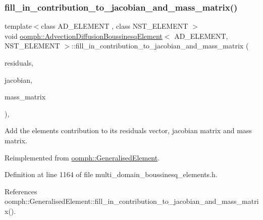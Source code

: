 \subsubsection{\texorpdfstring{fill\+\_\+in\+\_\+contribution\+\_\+to\+\_\+jacobian\+\_\+and\+\_\+mass\+\_\+matrix()}{fill\_in\_contribution\_to\_jacobian\_and\_mass\_matrix()}}
{\footnotesize\ttfamily template$<$class A\+D\+\_\+\+E\+L\+E\+M\+E\+NT , class N\+S\+T\+\_\+\+E\+L\+E\+M\+E\+NT $>$ \\
void \hyperlink{classoomph_1_1AdvectionDiffusionBoussinesqElement}{oomph\+::\+Advection\+Diffusion\+Boussinesq\+Element}$<$ A\+D\+\_\+\+E\+L\+E\+M\+E\+NT, N\+S\+T\+\_\+\+E\+L\+E\+M\+E\+NT $>$\+::fill\+\_\+in\+\_\+contribution\+\_\+to\+\_\+jacobian\+\_\+and\+\_\+mass\+\_\+matrix (\begin{DoxyParamCaption}\item[{\hyperlink{classoomph_1_1Vector}{Vector}$<$ double $>$ \&}]{residuals,  }\item[{\hyperlink{classoomph_1_1DenseMatrix}{Dense\+Matrix}$<$ double $>$ \&}]{jacobian,  }\item[{\hyperlink{classoomph_1_1DenseMatrix}{Dense\+Matrix}$<$ double $>$ \&}]{mass\+\_\+matrix }\end{DoxyParamCaption})\hspace{0.3cm}{\ttfamily [inline]}, {\ttfamily [virtual]}}



Add the element\textquotesingle{}s contribution to its residuals vector, jacobian matrix and mass matrix. 



Reimplemented from \hyperlink{classoomph_1_1GeneralisedElement_a2b6294a730647cf865da94f2531466f8}{oomph\+::\+Generalised\+Element}.



Definition at line 1164 of file multi\+\_\+domain\+\_\+boussinesq\+\_\+elements.\+h.



References oomph\+::\+Generalised\+Element\+::fill\+\_\+in\+\_\+contribution\+\_\+to\+\_\+jacobian\+\_\+and\+\_\+mass\+\_\+matrix().

\mbox{\label{classoomph_1_1AdvectionDiffusionBoussinesqElement_a9e859b487d8398ae696de72104c76271}} 
